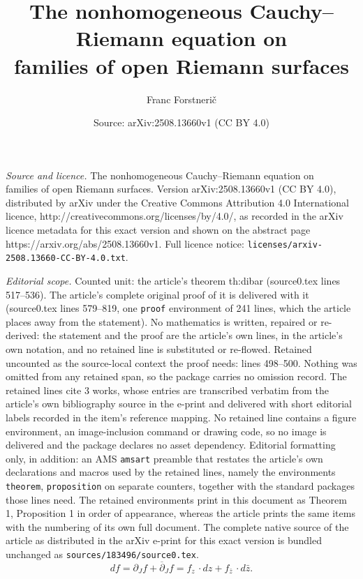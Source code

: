 \documentclass[10pt,a4paper]{amsart}
\title{The nonhomogeneous Cauchy--Riemann equation on \\ families of open Riemann surfaces}
\author{Franc Forstneri{\v c}}
\date{Source: arXiv:2508.13660v1 (CC BY 4.0)}
\newcommand\di{\partial}
\newcommand\dibar{\overline\partial}
\begin{document}
\maketitle

\noindent\emph{Source and licence.} The nonhomogeneous Cauchy--Riemann equation on \\ families of open Riemann surfaces. Version arXiv:2508.13660v1 (CC BY 4.0), distributed by arXiv under the Creative Commons Attribution 4.0 International licence, http://creativecommons.org/licenses/by/4.0/, as recorded in the arXiv licence metadata for this exact version and shown on the abstract page https://arxiv.org/abs/2508.13660v1. Full licence notice: \texttt{licenses/arxiv-2508.13660-CC-BY-4.0.txt}.\par\smallskip

\noindent\textit{Editorial scope.} Counted unit: the article's theorem th:dibar (source0.tex lines 517--536). The article's complete original proof of it is delivered with it (source0.tex lines 579--819, one \texttt{proof} environment of 241 lines, which the article places away from the statement). No mathematics is written, repaired or re-derived: the statement and the proof are the article's own lines, in the article's own notation, and no retained line is substituted or re-flowed.  Retained uncounted as the source-local context the proof needs: lines 498--500.  Nothing was omitted from any retained span, so the package carries no omission record.  The retained lines cite 3 works, whose entries are transcribed verbatim from the article's own bibliography source in the e-print and delivered with short editorial labels recorded in the item's reference mapping.  No retained line contains a figure environment, an image-inclusion command or drawing code, so no image is delivered and the package declares no asset dependency.  Editorial formatting only, in addition: an AMS \texttt{amsart} preamble that restates the article's own declarations and macros used by the retained lines, namely the environments \texttt{theorem}, \texttt{proposition} on separate counters, together with the standard packages those lines need.  The retained environments print in this document as Theorem 1, Proposition 1 in order of appearance, whereas the article prints the same items with the numbering of its own full document.  The complete native source of the article as distributed in the arXiv e-print for this exact version is bundled unchanged as \texttt{sources/183496/source0.tex}.
\begin{equation}\label{eq:derivatives}
	df=\di_J f+\dibar_J f=f_z \,\cdotp dz + f_{\bar z} \,\cdotp d\bar z.  
\end{equation}
\end{document}
